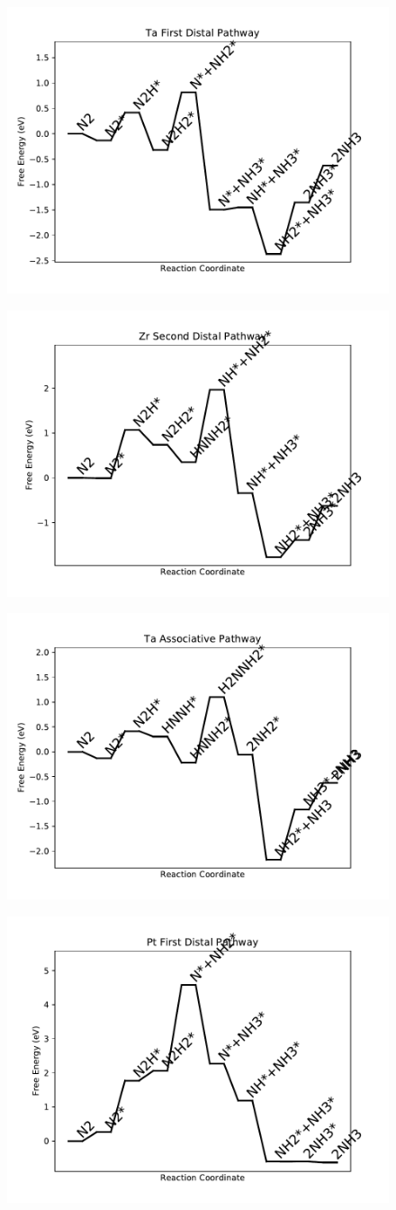 \documentclass[journal=jacsat,manuscript=article]{achemso}
\begin{document}
\begin{figure}
\includegraphics[width=0.5\linewidth]{data/plots/Ta_distal_1.pdf}
\label{fig:Ta_distal_1}
\end{figure}

\newpage
\begin{figure}
\includegraphics[width=0.5\linewidth]{data/plots/Zr_distal_2.pdf}
\label{fig:Zr_distal_2}
\end{figure}

\begin{figure}
\includegraphics[width=0.5\linewidth]{data/plots/Ta_associative.pdf}
\label{fig:Ta_associative}
\end{figure}

\newpage
\begin{figure}
\includegraphics[width=0.5\linewidth]{data/plots/Pt_distal_1.pdf}
\label{fig:Pt_distal_1}
\end{figure}
\end{document}

